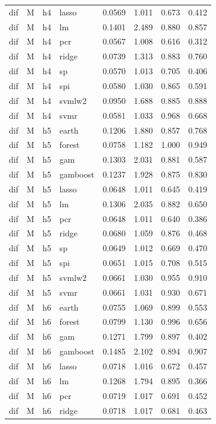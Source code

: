 \begin{ThreePartTable}
\begin{longtable}[t]{llclcccc}
dif & M & h4 & lasso & 0.0569 & 1.011 & 0.673 & 0.412\\
dif & M & h4 & lm & 0.1401 & 2.489 & 0.880 & 0.857\\
dif & M & h4 & pcr & 0.0567 & 1.008 & 0.616 & 0.312\\
dif & M & h4 & ridge & 0.0739 & 1.313 & 0.883 & 0.760\\
dif & M & h4 & sp & 0.0570 & 1.013 & 0.705 & 0.406\\
dif & M & h4 & spi & 0.0580 & 1.030 & 0.865 & 0.591\\
dif & M & h4 & svmlw2 & 0.0950 & 1.688 & 0.885 & 0.888\\
dif & M & h4 & svmr & 0.0581 & 1.033 & 0.968 & 0.668\\
\addlinespace
dif & M & h5 & earth & 0.1206 & 1.880 & 0.857 & 0.768\\
dif & M & h5 & forest & 0.0758 & 1.182 & 1.000 & 0.949\\
dif & M & h5 & gam & 0.1303 & 2.031 & 0.881 & 0.587\\
dif & M & h5 & gamboost & 0.1237 & 1.928 & 0.875 & 0.830\\
dif & M & h5 & lasso & 0.0648 & 1.011 & 0.645 & 0.419\\
dif & M & h5 & lm & 0.1306 & 2.035 & 0.882 & 0.650\\
dif & M & h5 & pcr & 0.0648 & 1.011 & 0.640 & 0.386\\
dif & M & h5 & ridge & 0.0680 & 1.059 & 0.876 & 0.468\\
dif & M & h5 & sp & 0.0649 & 1.012 & 0.669 & 0.470\\
dif & M & h5 & spi & 0.0651 & 1.015 & 0.708 & 0.515\\
dif & M & h5 & svmlw2 & 0.0661 & 1.030 & 0.955 & 0.910\\
dif & M & h5 & svmr & 0.0661 & 1.031 & 0.930 & 0.671\\
\addlinespace
dif & M & h6 & earth & 0.0755 & 1.069 & 0.899 & 0.553\\
dif & M & h6 & forest & 0.0799 & 1.130 & 0.996 & 0.656\\
dif & M & h6 & gam & 0.1271 & 1.799 & 0.897 & 0.402\\
dif & M & h6 & gamboost & 0.1485 & 2.102 & 0.894 & 0.907\\
dif & M & h6 & lasso & 0.0718 & 1.016 & 0.672 & 0.457\\
dif & M & h6 & lm & 0.1268 & 1.794 & 0.895 & 0.366\\
dif & M & h6 & pcr & 0.0719 & 1.017 & 0.691 & 0.452\\
dif & M & h6 & ridge & 0.0718 & 1.017 & 0.681 & 0.463\\

\end{longtable}
\end{ThreePartTable}
